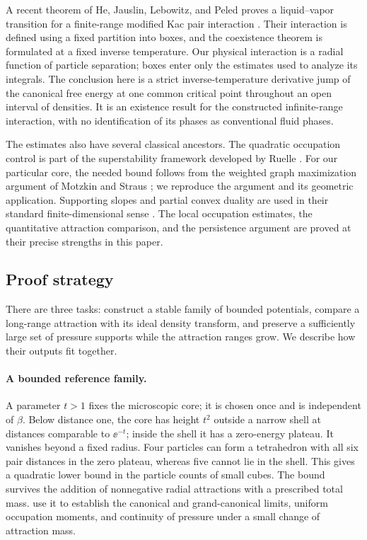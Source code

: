 A recent theorem of He, Jauslin, Lebowitz, and Peled proves a
liquid--vapor transition for a finite-range modified Kac pair
interaction \citep[Equation~(1.13), Theorems~1.3 and~1.5]{HeJauslinLebowitzPeled2026}.
Their interaction is defined using a fixed partition into boxes, and
the coexistence theorem is formulated at a fixed inverse temperature.
Our physical interaction is a radial function of particle separation;
boxes enter only the estimates used to analyze its integrals.  The
conclusion here is a strict inverse-temperature derivative jump of the
canonical free energy at one common critical point throughout an open
interval of densities.  It is an existence result for
the constructed infinite-range interaction, with no identification of
its phases as conventional fluid phases.

The estimates also have several classical ancestors.  The quadratic
occupation control is part of the superstability framework developed by Ruelle \citep{Ruelle1970}.
For our particular core, the needed bound follows from the weighted
graph maximization argument of Motzkin and Straus
\citep[Theorem~1]{MotzkinStraus1965}; we reproduce the argument and its
geometric application.  Supporting slopes and partial convex duality
are used in their standard finite-dimensional sense
\citep[Theorem~11.1 and Proposition~11.3]{RockafellarWets1998}.
The local occupation estimates, the quantitative attraction comparison,
and the persistence argument are proved at their precise strengths in
this paper.

\subsection{Proof strategy}

There are three tasks: construct a stable family of bounded potentials,
compare a long-range attraction with its ideal density transform, and
preserve a sufficiently large set of pressure supports while the
attraction ranges grow.  We describe how their outputs fit together.

\paragraph{A bounded reference family.}
A parameter \(t>1\) fixes the microscopic core; it is chosen once and is
independent of \(\beta\).  Below distance one, the core has height
\(t^2\) outside a narrow shell at distances comparable to \(\ee^{-t}\);
inside the shell it has a zero-energy plateau.  It vanishes beyond a
fixed radius.  Four particles can form a tetrahedron with all six pair
distances in the zero plateau, whereas five cannot lie in the shell.  This gives a quadratic lower bound
in the particle counts of small cubes.  The bound survives the addition
of nonnegative radial attractions with a prescribed total mass.
 use it to establish the canonical and
grand-canonical limits, uniform occupation moments, and continuity of
pressure under a small change of attraction mass.

